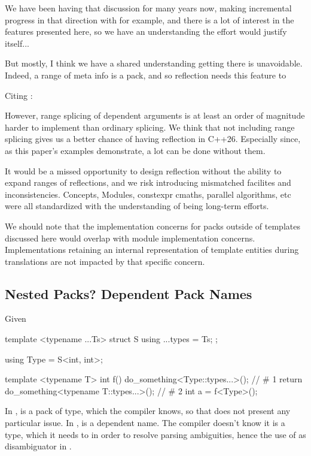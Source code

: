 \documentclass{wg21}
\begin{document}
We have been having that discussion for many years now, making incremental progress in that direction with  for example,
and there is a lot of interest in the features presented here, so we have an understanding the effort would justify itself...

But mostly, I think we have a shared understanding getting there is unavoidable.
Indeed, a range of meta info is a pack, and so reflection needs this feature to

Citing :

\begin{quoteblock}
However, range splicing of dependent arguments is at least an order of magnitude harder to implement than ordinary splicing. We think that not including range splicing gives us a better chance of having reflection in C++26. Especially since, as this paper’s examples demonstrate, a lot can be done without them.
\end{quoteblock}

It would be a missed opportunity to design reflection without the ability to expand ranges of reflections, and we risk introducing mismatched facilites and inconsistencies.
Concepts, Modules, constexpr cmaths, parallel algorithms, etc were all standardized with the understanding of being long-term efforts.

We should note that the implementation concerns for packs outside of templates discussed here would overlap with module implementation concerns.
Implementations retaining an internal representation of template entities during translations are not impacted by that specific concern.

\subsection{Nested Packs? Dependent Pack Names}

Given

\begin{colorblock}
template <typename ...Ts>
struct S {
    using ...types = Ts;
};

using Type = S<int, int>;

template <typename T>
int f() {
    do_something<Type::types...>(); // # 1
    return do_something<typename T::types...>(); // # 2
}
int a = f<Type>();
\end{colorblock}

In ,  is a pack of type, which the compiler knows, so that does not present any particular issue.
In ,  is a dependent name. The compiler doesn't know it is a type, which it needs to in order to resolve parsing ambiguities,
hence the use of  as disambiguator in .
\end{document}
